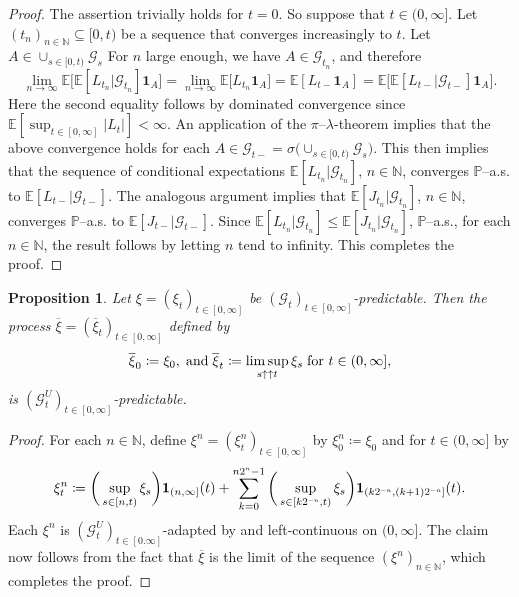 \documentclass[10pt]{article} %
\newtheorem{proposition}[theorem]{Proposition}
\newcommand\cG{\mathcal G}
\newcommand{\smalltext}[1]{\text{\fontsize{4}{4}\selectfont$#1$}}
\def \E{\mathbb{E}}
\def \N{\mathbb{N}}
\def \P{\mathbb{P}}
\newcommand{\1}{\mathbf{1}}
\begin{document}
\begin{proof}
	The assertion trivially holds for $t = 0$. So suppose that $t \in (0,\infty]$. Let $(t_n)_{n \in \N} \subseteq [0,t)$ be a sequence that converges increasingly to $t$. Let $A \in \cup_{s \in [0,t)} \cG_s$ For $n$ large enough, we have $A \in \cG_{t_n}$, and therefore
	\begin{equation*}
		\lim_{n \rightarrow \infty} \E\Big[\E[ L_{t_n} | \cG_{t_n}] \mathbf{1}_A\Big] = \lim_{n \rightarrow \infty} \E\Big[L_{t_n} \mathbf{1}_A\Big] = \E[L_{t-}\mathbf{1}_A] = \E\big[\E[L_{t-}|\cG_{t-}] \mathbf{1}_A\big].
	\end{equation*}
	Here the second equality follows by dominated convergence since $\E[\sup_{t \in [0,\infty]}|L_t|] < \infty$. An application of the $\pi$--$\lambda$-theorem implies that the above convergence holds for each $A \in \cG_{t-} = \sigma\big(\cup_{s \in [0,t)}\cG_s\big)$. This then implies that the sequence of conditional expectations $\E[L_{t_n}|\cG_{t_n}]$, $n \in \N$, converges $\P$--a.s. to $\E[L_{t-}| \cG_{t-}]$. The analogous argument implies that $\E[J_{t_n}|\cG_{t_n}]$, $n \in \N$, converges $\P$--a.s. to $\E[J_{t-}| \cG_{t-}]$. Since $\E[L_{t_n}| \cG_{t_n}] \leq \E[J_{t_n}| \cG_{t_n}]$, $\P$--a.s., for each $n \in \N$, the result follows by letting $n$ tend to infinity. This completes the proof.
\end{proof}

\begin{proposition}\label{prop::pred_left_limit}
	Let $\xi = (\xi_t)_{t \in [0,\infty]}$ be $(\cG_t)_{t \in [0,\infty]}$-predictable. Then the process $\overline\xi = (\overline\xi_t)_{t \in [0,\infty]}$ defined by
\begin{equation*}
	\overline\xi_0 \coloneqq \xi_0, \; \text{\rm and} \; \overline\xi_t \coloneqq \limsup_{s \uparrow\uparrow t} \xi_s \; \text{\rm for $t \in (0,\infty]$},
\end{equation*}
is $(\cG^U_t)_{t \in [0,\infty]}$-predictable.
\end{proposition}

\begin{proof}
	For each $n \in \mathbb{N}$, define $\xi^n = (\xi^n_t)_{t \in [0,\infty]}$ by $\xi^n_0 \coloneqq \xi_0$ and for $t \in (0,\infty]$ by
	\begin{equation*}
		\xi^n_t \coloneqq \bigg(\sup_{s \in [n,t)} \xi_s \bigg)\mathbf{1}_{(n,\infty]}(t) + \sum_{k = 0}^{n2^\smalltext{n}-1} \bigg(\sup_{s \in [k2^{\smalltext{-}\smalltext{n}},t)}\xi_s\bigg) \mathbf{1}_{(k2^{\smalltext{-}\smalltext{n}}, (k+1)2^{\smalltext{-}\smalltext{n}}]}(t).
	\end{equation*}
	Each $\xi^n$ is $(\cG^U_t)_{t \in [0.\infty]}$-adapted by \cite[Proposition 2.21]{karoui2013capacities} and left-continuous on $(0,\infty]$. The claim now follows from the fact that $\overline\xi$ is the limit of the sequence $(\xi^n)_{n \in \N}$, which completes the proof.
\end{proof}
\end{document}
